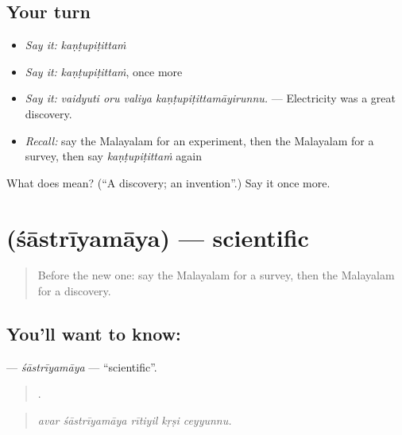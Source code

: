 \subsection*{Your turn}
\begin{itemize}
\raggedright
  \item \emph{Say it:} \emph{kaṇṭupiṭittaṁ}
  \item \emph{Say it:} \emph{kaṇṭupiṭittaṁ}, once more
  \item \emph{Say it:} \emph{vaidyuti oru valiya kaṇṭupiṭittamāyirunnu.} — Electricity was a great discovery.
  \item \emph{Recall:} say the Malayalam for an experiment, then the Malayalam for a survey, then say \emph{kaṇṭupiṭittaṁ} again
\end{itemize}

\begin{tcolorbox}[breakable,colback=teal!4,colframe=teal!35!black,title={Before you move on}]
What does  mean? (\textquotedblleft{}A discovery; an invention\textquotedblright{}.) Say it once more.
\end{tcolorbox}
\section[\texorpdfstring{\ml{ശാസ്ത്രീയമായ} (śāstrīyamāya)}{ശാസ്ത്രീയമായ (śāstrīyamāya)}]{ (śāstrīyamāya) — scientific}

\label{lesson:ML-C436-sastriyamaya}



\begin{quote}
Before the new one: say the Malayalam for a survey, then the Malayalam for a discovery.
\end{quote}

\subsection*{You'll want to know: }
\textbf{} — \emph{śāstrīyamāya} — \textquotedblleft{}scientific\textquotedblright{}.

\begin{quote}
    .
\end{quote}

\begin{quote}
\emph{avar śāstrīyamāya rītiyil kṛṣi ceyyunnu.}
\end{quote}

